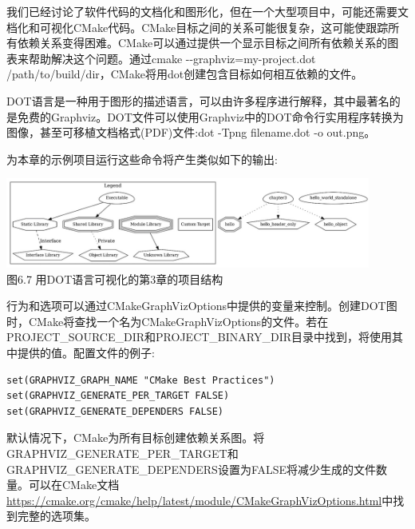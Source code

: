 

我们已经讨论了软件代码的文档化和图形化，但在一个大型项目中，可能还需要文档化和可视化CMake代码。CMake目标之间的关系可能很复杂，这可能使跟踪所有依赖关系变得困难。CMake可以通过提供一个显示目标之间所有依赖关系的图表来帮助解决这个问题。通过cmake -{}-graphviz=my-project.dot /path/to/build/dir，CMake将用dot创建包含目标如何相互依赖的文件。

DOT语言是一种用于图形的描述语言，可以由许多程序进行解释，其中最著名的是免费的Graphviz。DOT文件可以使用Graphviz中的DOT命令行实用程序转换为图像，甚至可移植文档格式(PDF)文件:dot -Tpng filename.dot -o out.png。

为本章的示例项目运行这些命令将产生类似如下的输出:

\begin{center}
\includegraphics[width=0.9\textwidth]{content/2/chapter6/images/7.jpg}\\
图6.7 用DOT语言可视化的第3章的项目结构
\end{center}

行为和选项可以通过CMakeGraphVizOptions中提供的变量来控制。创建DOT图时，CMake将查找一个名为CMakeGraphVizOptions的文件。若在PROJECT\_SOURCE\_DIR和PROJECT\_BINARY\_DIR目录中找到，将使用其中提供的值。配置文件的例子:

\begin{lstlisting}[style=styleCMake]
set(GRAPHVIZ_GRAPH_NAME "CMake Best Practices")
set(GRAPHVIZ_GENERATE_PER_TARGET FALSE)
set(GRAPHVIZ_GENERATE_DEPENDERS FALSE)
\end{lstlisting}

默认情况下，CMake为所有目标创建依赖关系图。将GRAPHVIZ\_GENERATE\_PER\_TARGET和GRAPHVIZ\_GENERATE\_DEPENDERS设置为FALSE将减少生成的文件数量。可以在CMake文档\url{https://cmake.org/cmake/help/latest/module/CMakeGraphVizOptions.html}中找到完整的选项集。

















